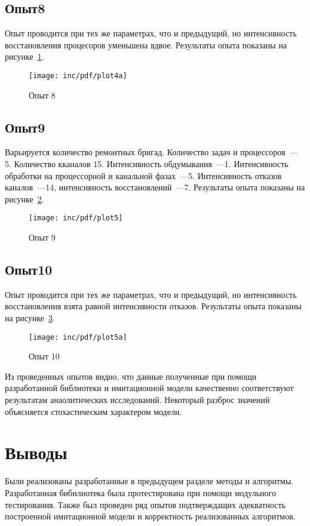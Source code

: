 \subsection*{Опыт8}

Опыт проводится при тех же параметрах, что и предыдущий, но интенсивность восстановления процесоров уменьшена вдвое. Результаты опыта показаны на рисунке~\ref{fig:plot4a}.

\begin{figure}[ht!]
  \centering
  \texttt{[image: inc/pdf/plot4a]}
  \caption{Опыт 8}
  \label{fig:plot4a}
\end{figure}

\subsection*{Опыт9}

Варьируется количество ремонтных бригад. Количество задач и процессоров~--- 5. Количество кканалов 15. Интенсивность обдумывания~---1. Интенсивность обработки на процессорной и канальной фазах~---5. Интенсивность отказов каналов~---14, интенсивность восстановлений~---7. Результаты опыта показаны на рисунке~\ref{fig:plot5}.

\begin{figure}[ht!]
  \centering
  \texttt{[image: inc/pdf/plot5]}
  \caption{Опыт 9}
  \label{fig:plot5}
\end{figure}

\subsection*{Опыт10}

Опыт проводится при тех же параметрах, что и предыдущий, но интенсивность восстановления взята равной интенсивности отказов. Результаты опыта показаны на рисунке~\ref{fig:plot5a}.

\begin{figure}[ht!]
  \centering
  \texttt{[image: inc/pdf/plot5a]}
  \caption{Опыт 10}
  \label{fig:plot5a}
\end{figure}

Из проведенных опытов видно, что данные полученные при помощи разработанной библиотеки и имитационной модели качественно соответствуют результатам анаолитических исследований. Некоторый разброс значений объясняется стохастическим характером модели.

\section{Выводы}

Были реализованы разработанные в предыдущем разделе методы и алгоритмы. Разработанная бибилиотека была протестирована при помощи модульного тестирования. Также был проведен ряд опытов подтверждащих адекватность построенной имитационной модели и корректность реализованных алгоритмов.
